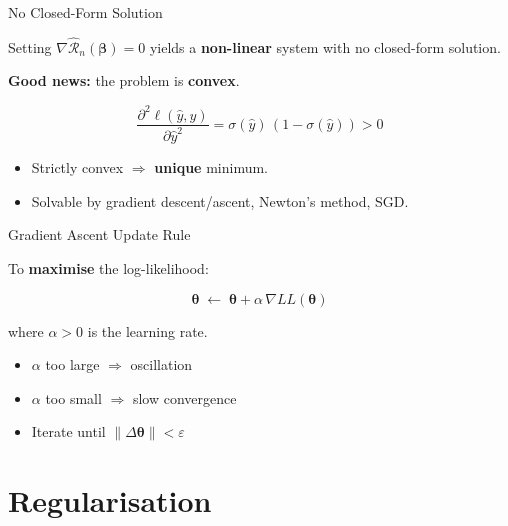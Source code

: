 \documentclass[aspectratio=169, professionalfonts]{beamer}
\begin{document}
\begin{frame}{No Closed-Form Solution}

Setting $\nabla\hat{\mathcal{R}}_n(\bm{\beta})=0$ yields a
\textbf{non-linear} system with no closed-form solution.

\bigskip

\textbf{Good news:} the problem is \textbf{convex}.

$$\frac{\partial^2\ell(\hat y, y)}{\partial\hat y^2}
  = \sigma(\hat y)\,(1-\sigma(\hat y)) > 0$$

\begin{itemize}
  \item Strictly convex $\Rightarrow$ \textbf{unique} minimum.
  \item Solvable by gradient descent/ascent, Newton's method, SGD.
\end{itemize}

\end{frame}

\begin{frame}{Gradient Ascent Update Rule}

To \textbf{maximise} the log-likelihood:

$$\bm{\theta} \;\leftarrow\; \bm{\theta} + \alpha\,\nabla LL(\bm{\theta})$$

where $\alpha > 0$ is the learning rate.

\bigskip

\begin{itemize}
  \item $\alpha$ too large $\Rightarrow$ oscillation
  \item $\alpha$ too small $\Rightarrow$ slow convergence
  \item Iterate until $\|\Delta\bm{\theta}\| < \varepsilon$
\end{itemize}

\end{frame}

\section{Regularisation}
\end{document}
